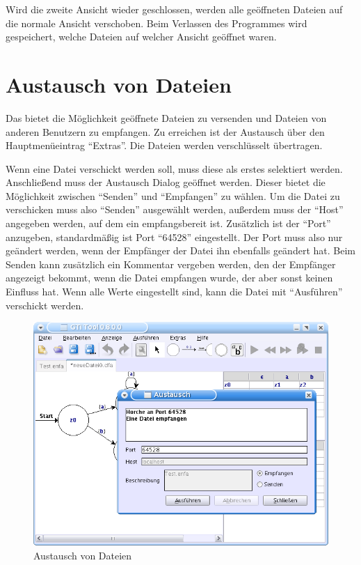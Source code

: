 Wird die zweite Ansicht wieder geschlossen, werden alle
geöffneten Dateien auf die normale Ansicht verschoben. Beim Verlassen des
Programmes wird gespeichert, welche Dateien auf welcher Ansicht geöffnet waren.


\section{Austausch von Dateien}

Das \gtitool bietet die Möglichkeit geöffnete Dateien zu versenden und Dateien
von anderen \gtitool Benutzern zu empfangen. Zu erreichen ist der Austausch über
den Hauptmenüeintrag "`Extras"'. Die Dateien werden verschlüsselt
übertragen.\vspace{10pt}

Wenn eine Datei verschickt werden soll, muss diese als erstes selektiert werden.
Anschließend muss der Austausch Dialog geöffnet werden. Dieser bietet die
Möglichkeit zwischen "`Senden"' und "`Empfangen"' zu wählen. Um die Datei zu
verschicken muss also "`Senden"' ausgewählt werden, außerdem muss der "`Host"'
angegeben werden, auf dem ein \gtitool empfangsbereit ist. Zusätzlich ist der
"`Port"' anzugeben, standardmäßig ist Port "`64528"' eingestellt. Der Port muss
also nur geändert werden, wenn der Empfänger der Datei ihn ebenfalls geändert
hat. Beim Senden kann zusätzlich ein Kommentar vergeben werden, den der Empfänger
angezeigt bekommt, wenn die Datei empfangen wurde, der aber sonst keinen
Einfluss hat. Wenn alle Werte eingestellt sind, kann die Datei mit
"`Ausführen"' verschickt werden.\vspace{10pt}

\begin{figure}[h]
\begin{center}
\includegraphics[width=12cm]{images/exchange.png}
\caption{Austausch von Dateien}
\end{center}
\end{figure}

